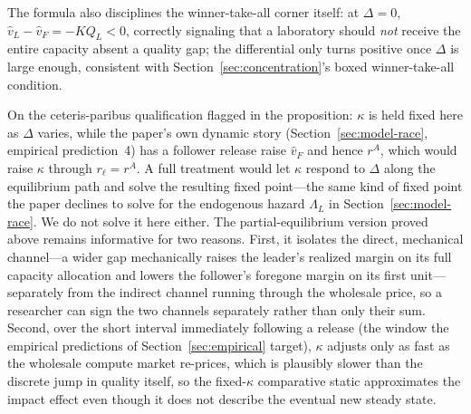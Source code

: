 \documentclass[11pt]{article}
\begin{document}
The formula also disciplines the winner-take-all corner itself: at $\Delta=0$, $\widehat v_L-\widehat v_F=-KQ_L<0$, correctly signaling that a laboratory should \emph{not} receive the entire capacity absent a quality gap; the differential only turns positive once $\Delta$ is large enough, consistent with Section~\ref{sec:concentration}'s boxed winner-take-all condition.

On the ceteris-paribus qualification flagged in the proposition: $\kappa$ is held fixed here as $\Delta$ varies, while the paper's own dynamic story (Section~\ref{sec:model-race}, empirical prediction~4) has a follower release raise $\widehat v_F$ and hence $r^A$, which would raise $\kappa$ through $r_\ell=r^A$. A full treatment would let $\kappa$ respond to $\Delta$ along the equilibrium path and solve the resulting fixed point---the same kind of fixed point the paper declines to solve for the endogenous hazard $\Lambda_L$ in Section~\ref{sec:model-race}. We do not solve it here either. The partial-equilibrium version proved above remains informative for two reasons. First, it isolates the direct, mechanical channel---a wider gap mechanically raises the leader's realized margin on its full capacity allocation and lowers the follower's foregone margin on its first unit---separately from the indirect channel running through the wholesale price, so a researcher can sign the two channels separately rather than only their sum. Second, over the short interval immediately following a release (the window the empirical predictions of Section~\ref{sec:empirical} target), $\kappa$ adjusts only as fast as the wholesale compute market re-prices, which is plausibly slower than the discrete jump in quality itself, so the fixed-$\kappa$ comparative static approximates the impact effect even though it does not describe the eventual new steady state.



\end{document}
